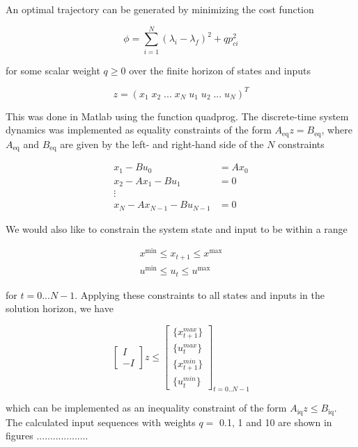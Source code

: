 An optimal trajectory can be generated by minimizing the cost function

\begin{equation}
	\label{eq:trajectory_cost}
	\phi = \sum_{i=1}^{N}(\lambda_i - \lambda_f)^2 + qp_{ci}^2
\end{equation}

for some scalar weight $q \geq 0$ over the finite horizon of states and inputs

\begin{equation}
	z = (x_1 \; x_2 \; ... \; x_N \; u_1 \; u_2 \; ... \; u_N)^T
\end{equation}

This was done in Matlab using the function quadprog. The discrete-time system dynamics was implemented as equality constraints of the form $A_{\text{eq}}z = B_{\text{eq}}$, where $A_{\text{eq}}$ and $B_{\text{eq}}$ are given by the left- and right-hand side of the $N$ constraints

\begin{align*}
	x_1 - Bu_0        &= Ax_0 \\
	x_2 - Ax_1 - Bu_1 &= 0    \\
	\vdots                    \\
	x_N - Ax_{N-1} - Bu_{N-1} &= 0
\end{align*}

We would also like to constrain the system state and input to be within a range

\begin{align}
	x^{\text{min}} \leq x_{t+1} \leq x^{\text{max}} \\
	u^{\text{min}} \leq u_t \leq u^{\text{max}}
\end{align}

for $t = 0...N-1$. Applying these constraints to all states and inputs in the solution horizon, we have

\begin{equation}
	\begin{bmatrix} I \\ -I \end{bmatrix} z
	\leq
	\begin{bmatrix}
	\{x_{t+1}^{max}\} \\
	\{u_t^{max}\} \\
	\{x_{t+1}^{min}\} \\
	\{u_t^{min}\}
	\end{bmatrix}_{t=0..N-1}
\end{equation}

which can be implemented as an inequality constraint of the form $A_{\text{iq}} z \leq B_{\text{iq}}$. The calculated input sequences with weights $q =$ 0.1, 1 and 10 are shown in figures ...................



